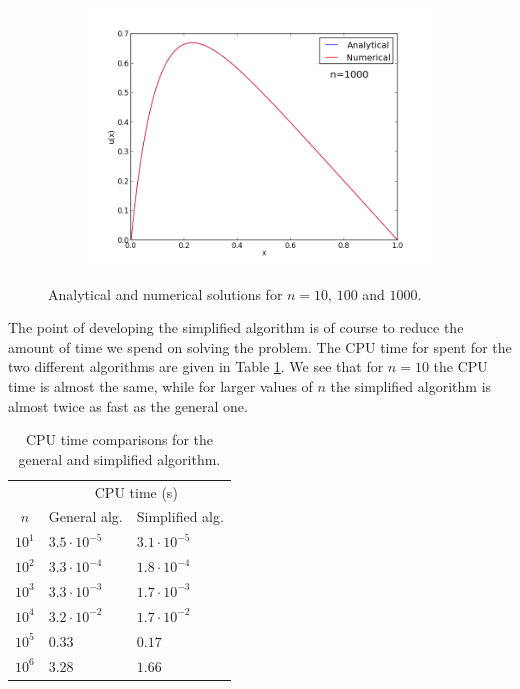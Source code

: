 \documentclass[12pt, a4paper]{article}
\begin{document}
\begin{figure}[ht!]
\begin{subfigure}[b]{0.495\textwidth}
        \includegraphics[width=\textwidth]{../Program/plot_n_1000.png}
  \end{subfigure}
  \caption{Analytical and numerical solutions for $n=10$, $100$ and $1000$.} 
  \label{plots}
\end{figure}

The point of developing the simplified algorithm is of course to reduce the amount of time we spend on 
solving the problem. The CPU time for spent for the two different algorithms are given in Table  
\ref{CPU}. We see that for $n=10$ the CPU time is almost the same, while for larger values of $n$ the 
simplified algorithm is almost twice as fast as the general one. 

\begin{table}[ht!]
\begin{center}
\begin{tabular}{c|l|l}
 & \multicolumn{2}{c}{CPU time (s)}  \\
$n$ & General alg. & Simplified alg. \\ \hline 
$10^1$ & $3.5\cdot10^{-5}$ & $3.1\cdot10^{-5}$  \\
$10^2$ & $3.3\cdot10^{-4}$ & $1.8\cdot10^{-4}$\\
$10^3$ & $3.3\cdot10^{-3}$ & $1.7\cdot10^{-3}$ \\
$10^4$ & $3.2\cdot10^{-2}$ & $1.7\cdot10^{-2}$\\
$10^5$ & $0.33$ & $0.17$ \\
$10^6$ & $3.28$ & $1.66$ \\ 
\end{tabular}
\caption{CPU time comparisons for the general and simplified algorithm.}
\label{CPU}
\end{center}
\end{table}
\end{document}
